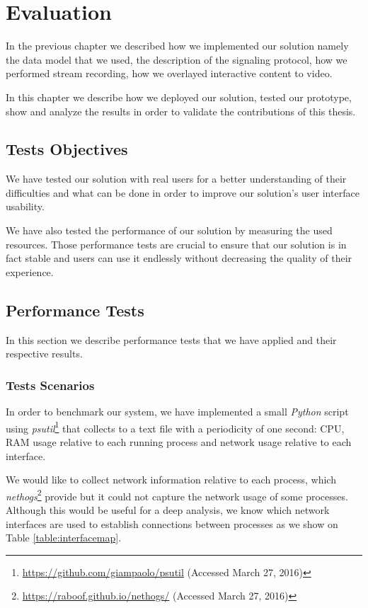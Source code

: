 \chapter{Evaluation}
\label{chapter:evaluation}
  In the previous chapter we described how we implemented our solution namely the data model that we used, the description of the signaling protocol, how we performed stream recording, how we overlayed interactive content to video. 

  In this chapter we describe how we deployed our solution, tested our prototype, show and analyze the results in order to validate the contributions of this thesis.



  

\section{Tests Objectives}

  We have tested our solution with real users for a better understanding of their difficulties and what can be done in order to improve our solution's user interface usability.

  We have also tested the performance of our solution by measuring the used resources. Those performance tests are crucial to ensure that our solution is in fact stable and users can use it endlessly without decreasing the quality of their experience. 


  \section {Performance Tests}

     In this section we describe performance tests that we have applied and their respective results.


    \subsection{Tests Scenarios}


      In order to benchmark our system, we have implemented a small \emph{Python} script using \emph{psutil}\footnote{\url{https://github.com/giampaolo/psutil} (Accessed March 27, 2016)} that collects to a text file with a periodicity of one second: CPU, RAM usage relative to each running process and network usage relative to each interface. 

      We would like to collect network information relative to each process, which \emph{nethogs}\footnote{\url{https://raboof.github.io/nethogs/} (Accessed March 27, 2016)} provide but it could not capture the network usage of some processes. Although this would be useful for a deep analysis, we know which network interfaces are used to establish connections between processes as we show on Table \ref{table:interfacemap}.

